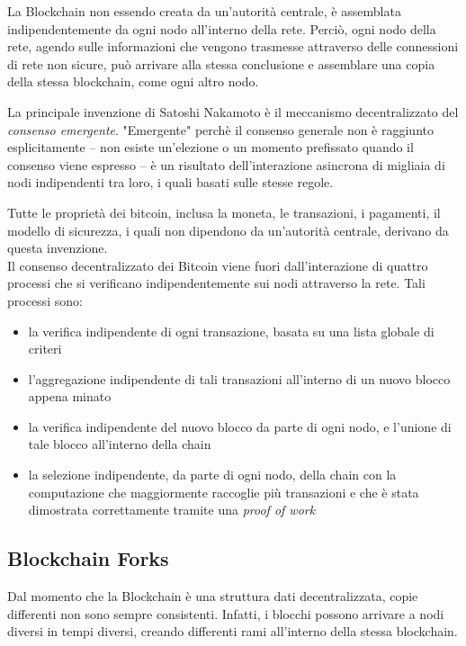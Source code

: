 La Blockchain non essendo creata da un'autorità centrale, è assemblata indipendentemente da ogni nodo all'interno della rete. Perciò, ogni nodo della rete, agendo sulle informazioni che vengono trasmesse attraverso delle connessioni di rete non sicure, può arrivare alla stessa conclusione e assemblare una copia della stessa blockchain, come ogni altro nodo.

La principale invenzione di Satoshi Nakamoto è il meccanismo decentralizzato del \textit{consenso emergente}. "Emergente" perchè il consenso generale non è raggiunto esplicitamente -- non esiste un'elezione o un momento prefissato quando il consenso viene espresso -- è un risultato dell'interazione asincrona di migliaia di nodi indipendenti tra loro, i quali basati sulle stesse regole.

Tutte le proprietà dei bitcoin, inclusa la moneta, le transazioni, i pagamenti, il modello di sicurezza, i quali non dipendono da un'autorità centrale, derivano da questa invenzione.\\
Il consenso decentralizzato dei Bitcoin viene fuori dall'interazione di quattro processi che si verificano indipendentemente sui nodi attraverso la rete. Tali processi sono:
\begin{itemize}
	\item la verifica indipendente di ogni transazione, basata su una lista globale di criteri
	\item  l'aggregazione indipendente di tali transazioni all'interno di un nuovo blocco appena minato
	\item la verifica indipendente del nuovo blocco da parte di ogni nodo, e l'unione di tale blocco all'interno della chain
	\item la selezione indipendente, da parte di ogni nodo, della chain con la computazione che maggiormente raccoglie più transazioni e che è stata dimostrata correttamente tramite una \textit{proof of work}
\end{itemize}
\cite{antonopoulos2014mastering}

\subsection{Blockchain Forks}

Dal momento che la Blockchain è una struttura dati decentralizzata, copie differenti non sono sempre consistenti. Infatti, i blocchi possono arrivare a nodi diversi in tempi diversi, creando differenti rami all'interno della stessa blockchain.

